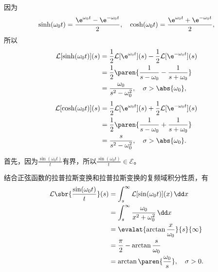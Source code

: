 \begin{example}[双曲函数]
    因为
    \begin{equation}
        \sinh(\omega_0 t)=\frac{\e^{\omega_0 t}-\e^{-\omega_0 t}}{2},\quad \cosh(\omega_0 t)=\frac{\e^{\omega_0 t}+\e^{-\omega_0 t}}{2},
    \end{equation}
    所以
    \begin{align}
        \mathcal{L}[\sinh(\omega_0 t)](s)&=\frac{1}{2}\mathcal{L}[\e^{\omega_0 t}](s)-\frac{1}{2}\mathcal{L}[\e^{-\omega_0 t}](s)\nonumber\\
        &=\frac{1}{2}\paren{\frac{1}{s-\omega_0}-\frac{1}{s+\omega_0}}\nonumber\\
        &=\frac{\omega_0}{s^2-\omega_0^2},\quad \sigma>\abs{\omega_0},
    \end{align}
    \begin{align}
        \mathcal{L}[\cosh(\omega_0 t)](s)&=\frac{1}{2}\mathcal{L}[\e^{\omega_0 t}](s)+\frac{1}{2}\mathcal{L}[\e^{-\omega_0 t}](s)\nonumber\\
        &=\frac{1}{2}\paren{\frac{1}{s-\omega_0}+\frac{1}{s+\omega_0}}\nonumber\\
        &=\frac{s}{s^2-\omega_0^2},\quad \sigma>\abs{\omega_0}.
    \end{align}
\end{example}

\begin{example}[采样函数]
    首先，因为$\displaystyle\frac{\sin(\omega_0 t)}{t}$有界，所以$\displaystyle\frac{\sin(\omega_0 t)}{t}\in\mathcal{E}$。

    结合正弦函数的拉普拉斯变换和拉普拉斯变换的复频域积分性质，有
    \begin{align}
        \mathcal{L}\sbr{\frac{\sin(\omega_0 t)}{t}}(s)&=\int_s^{\infty}\mathcal{L}[\sin(\omega_0 t)](x)\,\dd x\nonumber\\
        &=\int_s^{\infty}\frac{\omega_0}{x^2+\omega_0^2}\,\dd x\nonumber\\
        &=\evalat{\arctan\frac{x}{\omega_0}}{s}{\infty}\nonumber\\
        &=\frac{\pi}{2}-\arctan\frac{s}{\omega_0}\nonumber\\
        &=\arctan\paren{\frac{\omega_0}{s}},\quad \sigma>0.
    \end{align}
\end{example}

